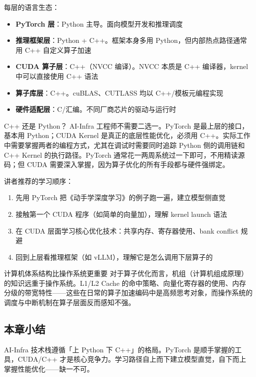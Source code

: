 \documentclass[a4paper]{article}
\begin{document}
每层的语言生态：
\begin{itemize}
    \item \textbf{PyTorch 层}：Python 主导。面向模型开发和推理调度
    \item \textbf{推理框架层}：Python + C++。框架本身多用 Python，但内部热点路径通常用 C++ 自定义算子加速
    \item \textbf{CUDA 算子层}：C++（NVCC 编译）。NVCC 本质是 C++ 编译器，kernel 中可以直接使用 C++ 语法
    \item \textbf{算子库层}：C++。cuBLAS、CUTLASS 均以 C++/模板元编程实现
    \item \textbf{硬件适配层}：C/汇编。不同厂商芯片的驱动与运行时
\end{itemize}

\begin{knowledgebox}{C++ 还是 Python？}
AI-Infra 工程师不需要二选一。PyTorch 是最上层的接口，基本用 Python；CUDA Kernel 是真正的底层性能优化，必须用 C++。实际工作中需要掌握两者的编程方式，尤其在调试时需要同时追踪 Python 侧的调用链和 C++ Kernel 的执行路径。PyTorch 通常花一两周系统过一下即可，不用精读源码；但 CUDA 需要深入掌握，因为算子优化的所有手段都与硬件强绑定。
\end{knowledgebox}

讲者推荐的学习顺序：
\begin{enumerate}
    \item 先用 PyTorch 把《动手学深度学习》的例子跑一遍，建立模型侧直觉
    \item 接触第一个 CUDA 程序（如简单的向量加），理解 kernel launch 语法
    \item 在 CUDA 层面学习核心优化技术：共享内存、寄存器使用、bank conflict 规避
    \item 回到上层看推理框架（如 vLLM），理解它是怎么调用下层算子的
\end{enumerate}

\begin{importantbox}{计算机体系结构比操作系统更重要}
对于算子优化而言，机组（计算机组成原理）的知识远重于操作系统。L1/L2 Cache 的命中策略、向量化寄存器的使用、内存分级的带宽特性——这些在日常的算子加速编码中是高频思考对象，而操作系统的调度与中断机制在算子层面反而感知不强。
\end{importantbox}

\subsection{本章小结}
AI-Infra 技术栈遵循「上 Python 下 C++」的格局。PyTorch 是顺手掌握的工具，CUDA/C++ 才是核心竞争力。学习路径自上而下建立模型直觉，自下而上掌握性能优化——缺一不可。
\end{document}
